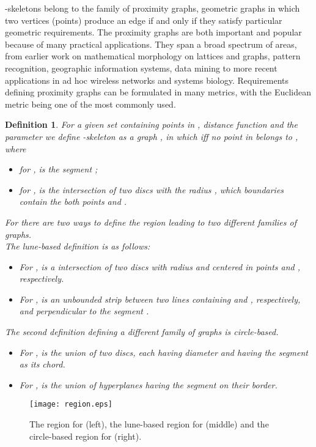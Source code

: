 \documentclass[10pt]{article}
\newtheorem{definition}{\textbf{Definition}}[section]
\begin{document}
-skeletons \cite{kr85} belong to the family of
proximity graphs, geometric graphs in which two vertices (points) produce an edge if and only if 
they satisfy particular geometric requirements. 
The proximity graphs are both important and popular because of many practical applications. 
They span a broad spectrum of areas, from earlier work on mathematical 
morphology on lattices and graphs, pattern recognition, geographic information systems, 
data mining to more recent applications in ad hoc wireless networks and  systems biology. 
Requirements defining proximity graphs can be formulated in many metrics, with the Euclidean metric 
being one of the most commonly used. 
\begin{definition}
For a given set  containing  points in , distance function  and the 
parameter   we define -skeleton as a graph , in which  
iff no point in  belongs to , where 
\begin{itemize}
\item 
for ,  is the segment ;
\item 
for ,  is the intersection  of two discs with the radius 
, which boundaries contain the both points  and . 
\end{itemize}
For   there are two ways to define the region  leading to two different 
families of graphs. \\
The lune-based definition is as follows:
\begin{itemize}
\item 
For   ,  is a intersection of two discs with radius 
 and centered in points  and , 
respectively.   
\item 
For ,  is an unbounded strip between two lines containing  
and , respectively, and perpendicular to the segment . 
\end{itemize} 
The second definition defining a different family of graphs is circle-based.
\begin{itemize}
\item
For ,  is the union  of two discs, each having diameter 
 and having the segment  as its chord.
 \item
For ,  is the union of hyperplanes having the segment  on 
their border.
\end{itemize}

\end{definition}


\begin{figure}[hbt]
\begin{center}
\texttt{[image: region.eps]}
\caption{ The region  for  (left), the lune-based region 
 for  (middle) and the circle-based region 
for  (right).  }
\label{fig:1}
\end{center}
\end{figure}
\end{document}
